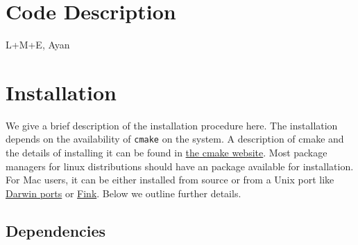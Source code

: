 \documentclass[preprint,3p,12pt]{elsarticle}
\begin{document}
\section{Code Description}
\label{sec:Code}

L+M+E, Ayan


\newpage

\section{Installation}
\label{sec:Installation}

We give a brief description of the installation procedure here. The installation depends on the availability of \texttt{cmake} on the system. A description of cmake and the details of installing it can be found in \href{https://cmake.org/}{the cmake website}. Most package managers for linux distributions should have an package available for installation. For Mac users, it can be either installed from source or from a Unix port like \href{https://www.macports.org/}{Darwin ports} or \href{http://www.finkproject.org/}{Fink}. Below we outline further details. 

\subsection{Dependencies}
\end{document}
